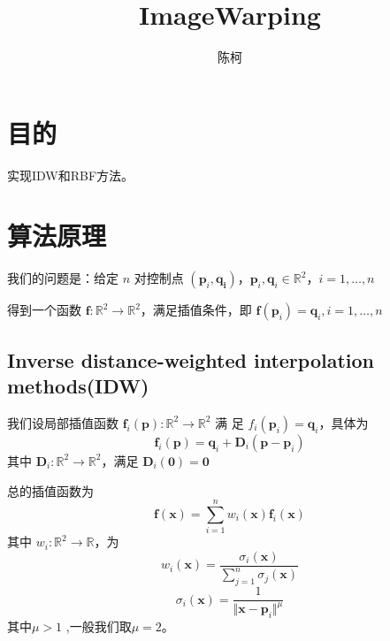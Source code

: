 \documentclass{article}
\title{ImageWarping}
\author{陈柯}
\begin{document}
	\maketitle
	
	\section{目的}
	
	实现IDW和RBF方法。
	
	\section{算法原理}
	我们的问题是：给定 $n$ 对控制点 $(\mathbf{p} _ i,\mathbf{q _ 
	i})$，$\mathbf{p} _ i,\mathbf{q} _ i\in\mathbb{R}^2$，$i=1,\dots,n$ 
	
	得到一个函数 $\mathbf{f}:\mathbb{R}^2\to\mathbb{R}^2$，满足插值条件，即 
	$\mathbf{f}(\mathbf{p} _ i)=\mathbf{q} _ i,i=1,\dots,n$ 
	\subsection{Inverse distance-weighted interpolation methods(IDW)}
	我们设局部插值函数 $\mathbf{f} _ i(\mathbf{p}):\mathbb{R}^2\to\mathbb{R}^2$ 满
	足 $f _ i(\mathbf{p} _ i)=\mathbf{q} _ i$，具体为
	$$
	\mathbf{f} _ i(\mathbf{p})=\mathbf{q} _ i+\mathbf{D} _ 
	i(\mathbf{p}-\mathbf{p} _ i)
	$$
	其中 $\mathbf{D} _ i:\mathbb{R}^2\to\mathbb{R}^2$，满足 $\mathbf{D} _ 
	i(\mathbf{0})=\mathbf{0}$ 
	
	总的插值函数为
	$$
	\mathbf{f}(\mathbf{x})=\sum _ {i=1}^n w _ i(\mathbf{x})\mathbf{f} _ 
	i(\mathbf{x})
	$$
	其中 $w_i:\mathbb{R}^2\to\mathbb{R}$，为
	$$
	w_i(\mathbf{x})=\frac{\sigma_i(\mathbf{x})}{\sum _ {j=1}^n \sigma _ 
	j(\mathbf{x})}
	$$
	$$
	\sigma _ i(\mathbf{x})=\frac{1}{\Vert\mathbf{x}-\mathbf{p} _ i\Vert^\mu}
	$$
	其中$\mu>1$ ,一般我们取$\mu=2$。
	
\end{document}
